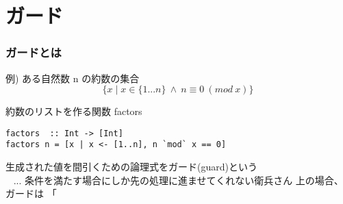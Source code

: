 \documentclass[dvipdfmx,cjk,xcolor=dvipsnames,envcountsect,notheorems,12pt]{beamer}
\theoremstyle{definition}
\begin{document}
%  
%

\section{ガード}


\begin{frame}[fragile]
\frametitle{ガードとは}
\begin{exampleblock}{例) ある自然数 n の約数の集合}
    \begin{equation*}
    \{ x \mid x \in \{ 1 ... n \} ~ \land ~ n \equiv 0 ~ (mod ~ x) \}
    \end{equation*}
    \vfill
\end{exampleblock}
\begin{exampleblock}{約数のリストを作る関数 factors}
\begin{lstlisting}[frame=none]
factors  :: Int -> [Int]
factors n = [x | x <- [1..n], n `mod` x == 0]
\end{lstlisting}
\end{exampleblock}
生成された値を間引くための論理式を\alert{ガード(guard)}という
\\ {\scriptsize ~ ... 条件を満たす場合にしか先の処理に進ませてくれない衛兵さん}
\vfill 上の場合、ガードは 「\alert{ } \color{black}{」の部分}
\end{frame}
\end{document}
